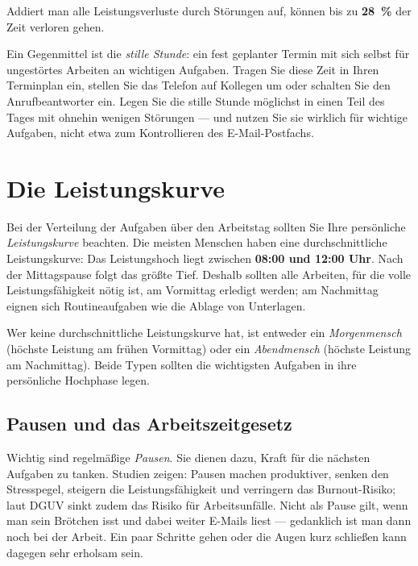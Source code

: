 \documentclass[11pt, a4paper]{article}
\begin{document}
\begin{merksatz}
Addiert man alle Leistungsverluste durch Störungen auf, können bis zu \textbf{28~\%} der
Zeit verloren gehen.
\end{merksatz}

Ein Gegenmittel ist die \emph{stille Stunde}: ein fest geplanter Termin mit sich selbst
für ungestörtes Arbeiten an wichtigen Aufgaben. Tragen Sie diese Zeit in Ihren
Terminplan ein, stellen Sie das Telefon auf Kollegen um oder schalten Sie den
Anrufbeantworter ein. Legen Sie die stille Stunde möglichst in einen Teil des Tages mit
ohnehin wenigen Störungen --- und nutzen Sie sie wirklich für wichtige Aufgaben, nicht
etwa zum Kontrollieren des E-Mail-Postfachs.

\section{Die Leistungskurve}

Bei der Verteilung der Aufgaben über den Arbeitstag sollten Sie Ihre persönliche
\emph{Leistungskurve} beachten. Die meisten Menschen haben eine durchschnittliche
Leistungskurve: Das Leistungshoch liegt zwischen \textbf{08:00 und 12:00 Uhr}. Nach der
Mittagspause folgt das größte Tief. Deshalb sollten alle Arbeiten, für die volle
Leistungsfähigkeit nötig ist, am Vormittag erledigt werden; am Nachmittag eignen sich
Routineaufgaben wie die Ablage von Unterlagen.

Wer keine durchschnittliche Leistungskurve hat, ist entweder ein \emph{Morgenmensch}
(höchste Leistung am frühen Vormittag) oder ein \emph{Abendmensch} (höchste Leistung am
Nachmittag). Beide Typen sollten die wichtigsten Aufgaben in ihre persönliche Hochphase
legen.

\subsection{Pausen und das Arbeitszeitgesetz}

Wichtig sind regelmäßige \emph{Pausen}. Sie dienen dazu, Kraft für die nächsten Aufgaben
zu tanken. Studien zeigen: Pausen machen produktiver, senken den Stresspegel, steigern
die Leistungsfähigkeit und verringern das Burnout-Risiko; laut DGUV sinkt zudem das
Risiko für Arbeitsunfälle. Nicht als Pause gilt, wenn man sein Brötchen isst und dabei
weiter E-Mails liest --- gedanklich ist man dann noch bei der Arbeit. Ein paar Schritte
gehen oder die Augen kurz schließen kann dagegen sehr erholsam sein.
\end{document}

